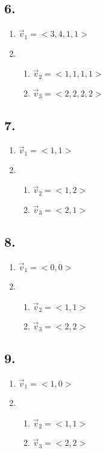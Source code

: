 \documentclass{article}
\begin{document}
\subsection{6.}
\begin{enumerate}[label=\textbf{\alph*.}]
	\item $ \vec{v}_1 = <3, 4, 1, 1> $
	\item
		\begin{enumerate}[label=\textbf{\arabic*.}]
			\item $ \vec{v}_2 = <1, 1, 1, 1> $
			\item $ \vec{v}_3 = <2, 2, 2, 2> $
		\end{enumerate}
\end{enumerate}

\subsection{7.}
\begin{enumerate}[label=\textbf{\alph*.}]
	\item $ \vec{v}_1 = <1, 1> $
	\item
		\begin{enumerate}[label=\textbf{\arabic*.}]
			\item $ \vec{v}_2 = <1, 2> $
			\item $ \vec{v}_3 = <2, 1> $
		\end{enumerate}
\end{enumerate}

\subsection{8.}
\begin{enumerate}[label=\textbf{\alph*.}]
	\item $ \vec{v}_1 = <0, 0> $
	\item
		\begin{enumerate}[label=\textbf{\arabic*.}]
			\item $ \vec{v}_2 = <1, 1> $
			\item $ \vec{v}_3 = <2, 2> $
		\end{enumerate}
\end{enumerate}

\subsection{9.}
\begin{enumerate}[label=\textbf{\alph*.}]
	\item $ \vec{v}_1 = <1, 0> $
	\item
		\begin{enumerate}[label=\textbf{\arabic*.}]
			\item $ \vec{v}_2 = <1, 1> $
			\item $ \vec{v}_3 = <2, 2> $
		\end{enumerate}
\end{enumerate}
\end{document}
